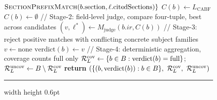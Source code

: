 \begin{figure}[!htbp]
\begin{algorithmic}[1]
      {$\textsc{SectionPrefixMatch}(b.\mathrm{section},\ell.\mathrm{citedSections})\}$}
    \State $C(b)\gets L_{\mathrm{CABF}}$ 
  \Else
    \State $C(b)\gets\emptyset$
  \EndIf
  \State // Stage-2: field-level judge, compare four-tuple, best across candidates
  \State $(v,\ell^{*})\gets M_{\mathrm{judge}}(b.\mathit{ir}, C(b))$
  \Statex {}
  \State // Stage-3: reject positive matches with conflicting concrete subject families
    \State $v\gets\text{none}$
    \Statex {}
  \EndIf
  \State $\mathrm{verdict}(b)\gets v$
\EndFor
\State // Stage-4: deterministic aggregation, coverage counts full only
\State $\mathcal{R}_L^{\mathrm{cov}}\gets\{b\in B:\mathrm{verdict}(b)=\text{full}\}$;\quad
  $\mathcal{R}_L^{\mathrm{uncov}}\gets B\setminus \mathcal{R}_L^{\mathrm{cov}}$
\State \textbf{return} $(\{(b,\mathrm{verdict}(b)):b\in B\},\ \RLcov,\ \RLunc)$
\end{algorithmic}
\hrule width \linewidth height 0.6pt\relax
\end{figure}
